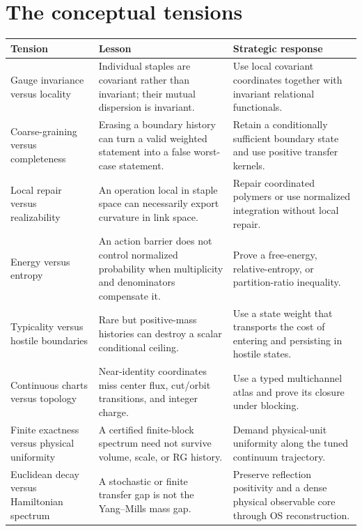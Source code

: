 \section{The conceptual tensions}

\begin{longtable}{p{}p{}p{}}
\toprule
Tension & Lesson & Strategic response\\
\midrule
\endhead
Gauge invariance versus locality & Individual staples are covariant rather
than invariant; their mutual dispersion is invariant. & Use local covariant
coordinates together with invariant relational functionals.\\
\addlinespace
Coarse-graining versus completeness & Erasing a boundary history can turn a
valid weighted statement into a false worst-case statement. & Retain a
conditionally sufficient boundary state and use positive transfer kernels.\\
\addlinespace
Local repair versus realizability & An operation local in staple space can
necessarily export curvature in link space. & Repair coordinated polymers or
use normalized integration without local repair.\\
\addlinespace
Energy versus entropy & An action barrier does not control normalized
probability when multiplicity and denominators compensate it. & Prove a
free-energy, relative-entropy, or partition-ratio inequality.\\
\addlinespace
Typicality versus hostile boundaries & Rare but positive-mass histories can
destroy a scalar conditional ceiling. & Use a state weight that transports
the cost of entering and persisting in hostile states.\\
\addlinespace
Continuous charts versus topology & Near-identity coordinates miss center
flux, cut/orbit transitions, and integer charge. & Use a typed multichannel
atlas and prove its closure under blocking.\\
\addlinespace
Finite exactness versus physical uniformity & A certified finite-block
spectrum need not survive volume, scale, or RG history. & Demand physical-unit
uniformity along the tuned continuum trajectory.\\
\addlinespace
Euclidean decay versus Hamiltonian spectrum & A stochastic or finite transfer
gap is not the Yang--Mills mass gap. & Preserve reflection positivity and a
dense physical observable core through OS reconstruction.\\
\bottomrule
\end{longtable}

